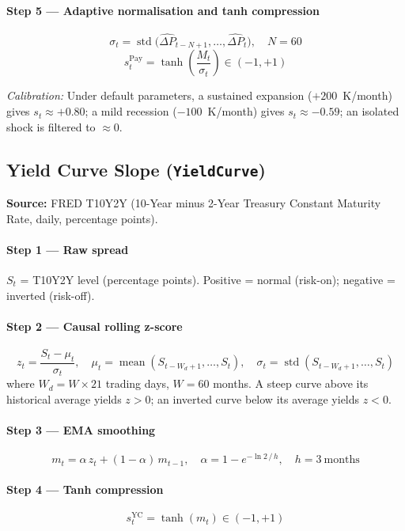 \documentclass[11pt, a4paper]{article}
\begin{document}
\paragraph{Step 5 — Adaptive normalisation and tanh compression}
\[
  \sigma_t = \operatorname{std}\!\bigl(\widehat{\Delta P}_{t-N+1},\ldots,\widehat{\Delta P}_t\bigr),
  \quad N = 60
\]
\[
  \boxed{s_t^{\text{Pay}} = \tanh\!\left(\frac{M_t}{\sigma_t}\right) \in (-1,+1)}
\]

\textit{Calibration:} Under default parameters, a sustained expansion
($+200$~K/month) gives $s_t \approx +0.80$; a mild recession ($-100$~K/month)
gives $s_t \approx -0.59$; an isolated shock is filtered to $\approx 0$.

\subsection{Yield Curve Slope (\texttt{YieldCurve})}
\label{sec:yield}

\textbf{Source:} FRED T10Y2Y (10-Year minus 2-Year Treasury Constant Maturity
Rate, daily, percentage points).

\paragraph{Step 1 — Raw spread}
$S_t$ = T10Y2Y level (percentage points). Positive = normal (risk-on);
negative = inverted (risk-off).

\paragraph{Step 2 — Causal rolling z-score}
\[
  z_t = \frac{S_t - \mu_t}{\sigma_t},
  \quad
  \mu_t = \operatorname{mean}(S_{t-W_d+1},\ldots,S_t),
  \quad
  \sigma_t = \operatorname{std}(S_{t-W_d+1},\ldots,S_t)
\]
where $W_d = W \times 21$ trading days, $W = 60$ months. A steep curve above
its historical average yields $z > 0$; an inverted curve below its average
yields $z < 0$.

\paragraph{Step 3 — EMA smoothing}
\[
  m_t = \alpha\, z_t + (1-\alpha)\, m_{t-1},
  \quad \alpha = 1 - e^{-\ln 2\,/\,h},\quad h = 3\ \text{months}
\]

\paragraph{Step 4 — Tanh compression}
\[
  \boxed{s_t^{\text{YC}} = \tanh(m_t) \in (-1,+1)}
\]
\end{document}
